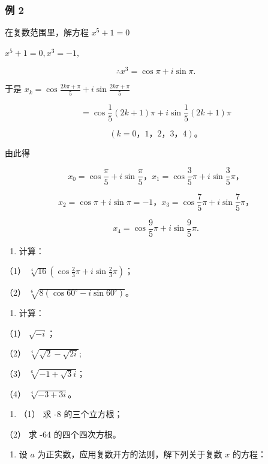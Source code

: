 \subsubsection{例 2}

在复数范围里，解方程 \(x^{5} + 1 = 0\)

 \(x^{5} + 1 = 0, x^{3} = -1,\)

\[
\therefore x ^ {3} = \cos \pi + i \sin \pi .
\]

于是
\(x_{k} = \cos \frac{2k\pi + \pi}{5} + i\sin \frac{2k\pi + \pi}{5}\)

\[
= \cos \frac {1}{5} (2 k + 1) \pi + i \sin \frac {1}{5} (2 k + 1) \pi
\]

\[
(k = 0\text{，} 1\text{，} 2\text{，} 3\text{，} 4)\text{。}
\]

由此得

\[
x _ {0} = \cos \frac {\pi}{5} + i \sin \frac {\pi}{5}\text{，} x _ {1} = \cos \frac {3}{5} \pi + i \sin \frac {3}{5} \pi \text{，}
\]

\[
x _ {2} = \cos \pi + i \sin \pi = - 1\text{，} x _ {3} = \cos \frac {7}{5} \pi + i \sin \frac {7}{5} \pi \text{，}
\]

\[
x _ {4} = \cos \frac {9}{5} \pi + i \sin \frac {9}{5} \pi .
\]

\begin{enumerate}
\item
  计算：
\end{enumerate}

（1）
\(\sqrt[4]{16}\left(\cos \frac{2}{3}\pi + i\sin \frac{2}{3}\pi\right)\)；

（2） \(\sqrt[6]{8(\cos 60^\circ - i\sin 60^\circ)}\)。

\begin{enumerate}[start=2]
\item
  计算：
\end{enumerate}

（1） \(\sqrt{-i}\)；

（2） \(\sqrt[4]{\sqrt{2} - \sqrt{2i}};\)

（3） \(\sqrt[6]{-1 + \sqrt{3}i}\)；

（4） \(\sqrt[4]{-3 + 3i}\)。

\begin{enumerate}[start=3]
\item
  （1） 求 -8 的三个立方根；
\end{enumerate}

（2） 求 -64 的四个四次方根。

\begin{enumerate}[start=4]
\item
  设 \(a\) 为正实数，应用复数开方的法则，解下列关于复数 \(x\) 的方程：
\end{enumerate}

